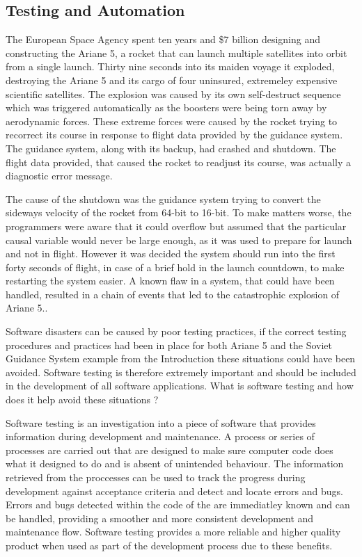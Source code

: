 \documentclass[a4paper,12pt]{article}
\begin{document}
\subsection{Testing and Automation}
\par The European Space Agency spent ten years and \$7 billion designing and constructing the Ariane 5, a rocket that can launch multiple satellites into orbit from a single launch. Thirty nine seconds into its maiden voyage it exploded, destroying the Ariane 5 and its cargo of four uninsured, extremeley expensive scientific satellites. The explosion was caused by its own self-destruct sequence which was triggered automatically as the boosters were being torn away by aerodynamic forces. These extreme forces were caused by the rocket trying to recorrect its course in response to flight data provided by the guidance system. The guidance system, along with its backup, had crashed and shutdown. The flight data provided, that caused the rocket to readjust its course, was actually a diagnostic error message. 
\vspace{5mm}
\par The cause of the shutdown was the guidance system trying to convert the sideways velocity of the rocket from 64-bit to 16-bit. To make matters worse, the programmers were aware that it could overflow but assumed that the particular causal variable would never be large enough, as it was used to prepare for launch and not in flight. However it was decided the system should run into the first forty seconds of flight, in case of a brief hold in the launch countdown, to make restarting the system easier. A known flaw in a system, that could have been handled, resulted in a chain of events that led to the catastrophic explosion of Ariane 5.\cite{Ariane5}.
\vspace{5mm}
\par Software disasters can be caused by poor testing practices\cite{mcquaid2012software}, if the correct testing procedures and practices had been in place for both Ariane 5 and the Soviet Guidance System example from the Introduction these situations could have been avoided. Software testing is therefore extremely important and should be included in the development of all software applications. What is software testing and how does it help avoid these situations ?
\vspace{5mm}
\par Software testing is an investigation into a piece of software that provides information during development and maintenance. A process or series of processes are carried out that are designed to make sure computer code does what it designed to do and is absent of unintended behaviour\cite{myers2011art}. The information retrieved from the proccesses can be used to track the progress during development against acceptance criteria and detect and locate errors and bugs. Errors and bugs detected within the code of the are immediatley known and can be handled, providing a smoother and more consistent development and maintenance flow. Software testing provides a more reliable and higher quality product when used as part of the development process due to these benefits.
\end{document}
